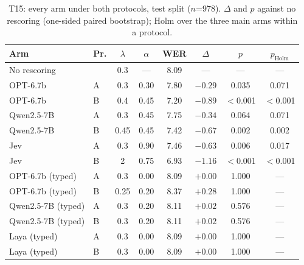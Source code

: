 \begin{table}[h]
\centering\scriptsize
\setlength{\tabcolsep}{3pt}
\begin{tabular}{llcccccc}
\toprule
Arm & Pr. & $\lambda$ & $\alpha$ & WER & $\Delta$ & $p$ & $p_{\text{Holm}}$ \\
\midrule
No rescoring & & 0.3 & --- & 8.09 & --- & --- & --- \\
OPT-6.7b & A & 0.3 & 0.30 & 7.80 & $-0.29$ & 0.035 & 0.071 \\
OPT-6.7b & B & 0.4 & 0.45 & 7.20 & $-0.89$ & $<$0.001 & $<$0.001 \\
Qwen2.5-7B & A & 0.3 & 0.45 & 7.75 & $-0.34$ & 0.064 & 0.071 \\
Qwen2.5-7B & B & 0.45 & 0.45 & 7.42 & $-0.67$ & 0.002 & 0.002 \\
Jev & A & 0.3 & 0.90 & 7.46 & $-0.63$ & 0.006 & 0.017 \\
Jev & B & 2 & 0.75 & 6.93 & $-1.16$ & $<$0.001 & $<$0.001 \\
OPT-6.7b (typed) & A & 0.3 & 0.00 & 8.09 & $+0.00$ & 1.000 & --- \\
OPT-6.7b (typed) & B & 0.25 & 0.20 & 8.37 & $+0.28$ & 1.000 & --- \\
Qwen2.5-7B (typed) & A & 0.3 & 0.20 & 8.11 & $+0.02$ & 0.576 & --- \\
Qwen2.5-7B (typed) & B & 0.3 & 0.20 & 8.11 & $+0.02$ & 0.576 & --- \\
Laya (typed) & A & 0.3 & 0.00 & 8.09 & $+0.00$ & 1.000 & --- \\
Laya (typed) & B & 0.3 & 0.00 & 8.09 & $+0.00$ & 1.000 & --- \\
\bottomrule
\end{tabular}
\caption{T15: every arm under both protocols, test split ($n$=978). $\Delta$ and $p$ against no rescoring (one-sided paired bootstrap); Holm over the three main arms within a protocol.}
\label{tab:fullt15}
\end{table}

